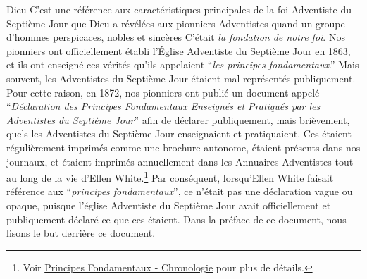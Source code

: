 Dieu  C'est une référence aux caractéristiques principales de la foi Adventiste du Septième Jour que Dieu a révélées aux pionniers Adventistes  quand un groupe d'hommes perspicaces, nobles et sincères  C'était \textit{la fondation de notre foi}. Nos pionniers ont officiellement établi l'Église Adventiste du Septième Jour en 1863, et ils ont enseigné ces vérités qu'ils appelaient “\textit{les principes fondamentaux}.” Mais souvent, les Adventistes du Septième Jour étaient mal représentés publiquement. Pour cette raison, en 1872, nos pionniers ont publié un document appelé “\textit{Déclaration des Principes Fondamentaux Enseignés et Pratiqués par les Adventistes du Septième Jour}” afin de déclarer publiquement, mais brièvement, quels  les Adventistes du Septième Jour enseignaient et pratiquaient. Ces  étaient régulièrement imprimés comme une brochure autonome, étaient présents dans nos journaux, et étaient imprimés annuellement dans les Annuaires Adventistes tout au long de la vie d'Ellen White.\footnote{Voir \hyperref[appendix:timeline]{Principes Fondamentaux - Chronologie} pour plus de détails.} Par conséquent, lorsqu'Ellen White faisait référence aux “\textit{principes fondamentaux}”, ce n'était pas une déclaration vague ou opaque, puisque l'église Adventiste du Septième Jour avait officiellement et publiquement déclaré ce que ces  étaient. Dans la préface de ce document, nous lisons le but derrière ce document.


